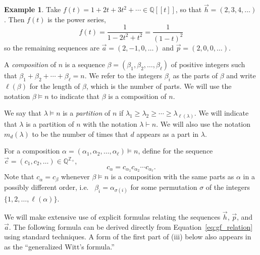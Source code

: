 \documentclass[11pt]{amsart}
\newcommand{\defncolor}{\color{darkred}}
\newcommand{\defn}[1]{{\defncolor\emph{#1}}} %
\theoremstyle{definition}
\newtheorem{example}[theorem]{Example}
\numberwithin{equation}{section}
\def\ZZ{{\mathbb Z}}
\def\QQ{{\mathbb Q}}
\begin{document}
\begin{example}
Take $f(t) = 1 + 2t + 3 t^{2} + \cdots \in \QQ[\![t]\!]$, so that $\vec{h} = (2, 3, 4, \ldots)$.
Then $f(t)$ is the power series,
\[
f(t) = \frac{1}{1 - 2 t^{2} + t^{2}} = \frac{1}{(1-t)^{2}}
\]
so the remaining sequences are $\vec{a} = (2, -1, 0, \ldots)$ and $\vec{p} = (2, 0, 0, \ldots)$.
\end{example}
A \defn{composition} of $n$ is a sequence $\beta = (\beta_1, \beta_2, \ldots, \beta_\ell)$ of positive integers such that $\beta_{1} + \beta_{2} + \cdots + \beta_{\ell} = n$.  
We refer to the integers $\beta_{i}$ as the parts of $\beta$ and write $\ell(\beta)$ for the length of $\beta$, which is the number of parts.  
We will use the notation $\beta \vDash n$ to indicate that $\beta$ is a composition of $n$.

We say that $\lambda \vDash n$ is a \defn{partition} of $n$ if $\lambda_1 \geq \lambda_2 \geq \cdots \geq \lambda_{\ell(\lambda)}$.  We will indicate that $\lambda$ is a partition
of $n$ with the notation $\lambda \vdash n$.  We will also use the notation $m_d(\lambda)$ to be the number of times
that $d$ appears as a part in $\lambda$.

For a composition $\alpha = (\alpha_{1}, \alpha_{2}, \ldots, \alpha_{\ell}) \vDash n$,
define for the sequence $\vec{c} = (c_{1}, c_{2}, \ldots) \in \QQ^{\ZZ_+}$,
\[
c_{\alpha} = c_{\alpha_{1}} c_{\alpha_{2}} \cdots c_{\alpha_{\ell}}.
\]
Note that $c_{\alpha} = c_{\beta}$ whenever $\beta \vDash n$ is a composition with the same parts as $\alpha$ in a possibly different order, i.e.~ $\beta_{i} = \alpha_{\sigma(i)}$ for some permutation $\sigma$ of the integers $\{1,2, \ldots, \ell(\alpha)\}$.


We will make extensive use of explicit formulas relating the sequences $\vec{h}$, $\vec{p}$, and $\vec{a}$.  The following formula can be derived directly from Equation~\eqref{eq:gf_relation} using standard techniques.  A form of the first part of (iii) below also appears in~\cite[Theorem 2.2]{KK95} as the ``generalized Witt's formula.''
\end{document}

